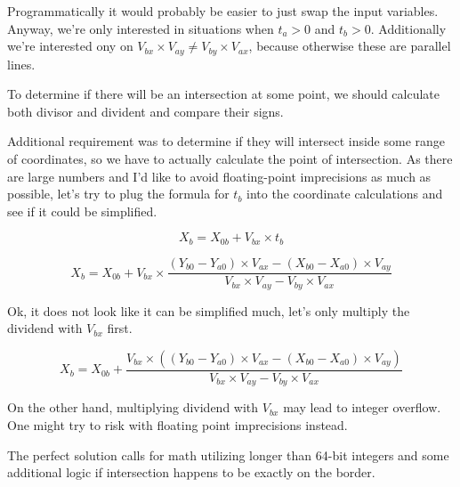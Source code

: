 \documentclass{article}
\begin{document}
Programmatically it would probably be easier to just swap the input variables. Anyway, we're only interested in situations when $t_a > 0$ and $t_b > 0$.
Additionally we're interested ony on $V_{bx} \times V_{ay} \neq V_{by} \times V_{ax}$, because otherwise these are parallel lines.

To determine if there will be an intersection at some point, we should calculate both divisor and divident and compare their signs.

Additional requirement was to determine if they will intersect inside some range of coordinates, so we have to actually calculate the
point of intersection. As there are large numbers and I'd like to avoid floating-point imprecisions as much as possible, let's try to plug the
formula for $t_b$ into the coordinate calculations and see if it could be simplified.



\begin{displaymath}
    X_b = X_{0b} + V_{bx} \times t_b
\end{displaymath}


\begin{displaymath}
    X_b = X_{0b} + V_{bx} \times \frac{(Y_{b0} - Y_{a0}) \times V_{ax} - (X_{b0} - X_{a0}) \times V_{ay}}{V_{bx} \times V_{ay} - V_{by} \times V_{ax}}
\end{displaymath}


Ok, it does not look like it can be simplified much, let's only multiply the dividend with $V_{bx}$ first.

\begin{displaymath}
    X_b = X_{0b} + \frac{V_{bx} \times ((Y_{b0} - Y_{a0}) \times V_{ax} - (X_{b0} - X_{a0}) \times V_{ay})}{V_{bx} \times V_{ay} - V_{by} \times V_{ax}}
\end{displaymath}

On the other hand, multiplying dividend with $V_{bx}$ may lead to integer overflow. One might try to risk with floating point imprecisions instead.

The perfect solution calls for math utilizing longer than 64-bit integers and some additional logic if intersection happens to be exactly on
the border.
\end{document}
